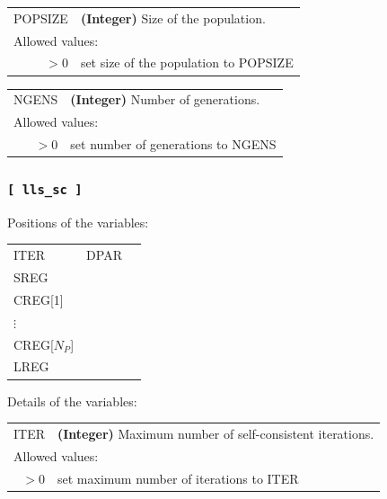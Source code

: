 \documentclass[10pt,a4paper,openany]{memoir}
\numberwithin{equation}{section}
\begin{document}
{
\begin{tabular}{r@{ : }l}
   POPSIZE &\textbf{(Integer)} Size of the population.                                  \\ 
\multicolumn{2}{l}{Allowed values:} \\ 
    \(>0\)& set size of the population to POPSIZE                                    \\ 
\end{tabular}
\vspace{1ex}
}

{
\begin{tabular}{r@{ : }l}
   NGENS &\textbf{(Integer)} Number of generations.                                  \\ 
\multicolumn{2}{l}{Allowed values:} \\ 
    \(>0\)& set number of generations to NGENS                                    \\ 
\end{tabular}
\vspace{1ex}
}

\subsubsection{\texttt{[~lls\_sc~]}}
\label{sec:descr:lls}

Positions of the variables:
\begin{center}
  \begin{tabular}{lll}
    ITER & DPAR & \\
    SREG &   & \\
    CREG[1] & & \\
    $\vdots$ & & \\
    CREG[$N_P$] & & \\
    LREG        & & 
  \end{tabular}
\end{center}

\noindent Details of the variables:
\vspace{2ex}


{
\begin{tabular}{r@{ : }l}
\label{descr:cycl}
   ITER &\textbf{(Integer)} Maximum number of self-consistent iterations.                                  \\ 
\multicolumn{2}{l}{Allowed values:} \\ 
    \(>0\)& set maximum number of iterations to ITER                                    \\ 
\end{tabular}
\vspace{1ex}
}
\end{document}
